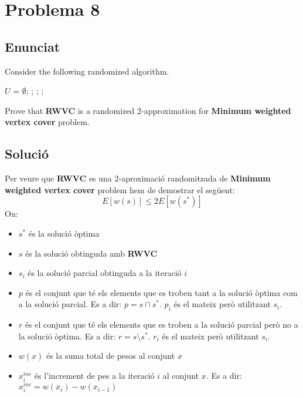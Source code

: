 \section{Problema 8}
\subsection{Enunciat}
Consider the following randomized algorithm.
\begin{algorithm}
\caption{}
\begin{algorithmic}[1]
 
\State $U$ = $\emptyset$;
    ;
    ;
    ;
\EndWhile
{}
\EndFunction
\end{algorithmic}
\end{algorithm}

Prove that \textbf{RWVC} is a randomized 2-approximation for \textbf{Minimum weighted vertex cover} problem.
\subsection{Solució}

Per veure que \textbf{RWVC} es una 2-aproximació randomitzada de \textbf{Minimum weighted vertex cover} problem hem de demostrar el següent:
\[
E[w(s)] \leq 2E[w(s^{*})]
\]
On:
\begin{itemize}
    \item $s^{*}$ és la solució òptima
    \item $s$ és la solució obtinguda amb \textbf{RWVC}
    \item $s_i$ és la solució parcial obtinguda a la iteració $i$
    \item $p$ és el conjunt que té els elements que es troben tant a la solució òptima com a la solució parcial. Es a dir: $p=s \cap s^{*}$. $p_i$ és el mateix però utilitzant $s_i$.
    \item $r$ és el conjunt que té els elements que es troben a la solució parcial però no a la solució òptima. Es a dir: $r=s \setminus s^{*}$. $r_i$ és el mateix però utilitzant $s_i$.
    \item $w(x)$ és la suma total de pesos al conjunt $x$
    \item $x_i^{inc}$ és l'increment de pes a la iteració $i$ al conjunt $x$. Es a dir: $x_i^{inc} = w(x_i) - w(x_{i-1})$
    
\end{itemize}
\newpage
